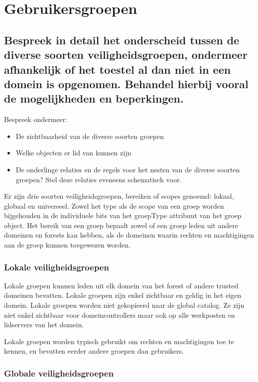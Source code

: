 \chapter{Gebruikersgroepen}

\section{Bespreek in detail het onderscheid tussen de diverse soorten
veiligheidsgroepen, ondermeer afhankelijk of het toestel al dan niet in een
domein is opgenomen. Behandel hierbij vooral de mogelijkheden en beperkingen.}

Bespreek ondermeer:
\begin{itemize}
	\item De zichtbaarheid van de diverse soorten groepen
	\item Welke objecten er lid van kunnen zijn
	\item De onderlinge relaties en de regels voor het nesten van de diverse
		soorten groepen? Stel deze relaties eveneens schematisch voor.
\end{itemize}

Er zijn drie soorten veiligheidsgroepen, bereiken of scopes genoemd: lokaal,
globaal en universeel. Zowel het type als de scope van een groep worden
bijgehouden in de individuele bits van het groepType attribuut van het groep
object. Het bereik van een groep bepaalt zowel of een groep leden uit andere
domeinen en forests kan hebben, als de domeinen waarin rechten en machtigingen
aan de groep kunnen toegewezen worden.

\subsection{Lokale veiligheidsgroepen}

Lokale groepen kunnen leden uit elk domein van het forest of andere trusted
domeinen bevatten. Lokale groepen zijn enkel zichtbaar en geldig in het eigen
domein. Lokale groepen worden niet gekopieerd naar de global catalog. Ze zijn
niet enkel zichtbaar voor domeincontrollers maar ook op alle werkposten en
lidservers van het domein.

Lokale groepen worden typisch gebruikt om rechten en machtigingen toe te kennen,
en bevatten eerder andere groepen dan gebruikers.

\subsection{Globale veiligheidsgroepen}

